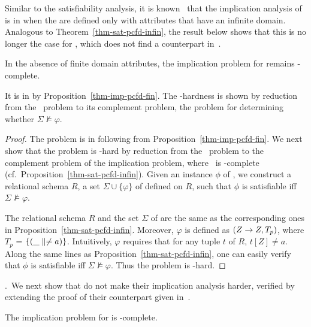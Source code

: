 Similar to the satisfiability analysis,
it is known~\cite{CFDs} that the implication analysis of
\CFDs is in \PTIME when the \CFDs are defined only with attributes that
have an infinite domain. Analogous to Theorem~\ref{thm-sat-pcfd-infin},
the result below shows that this is no longer the case for \pCFDs,
which does not find a counterpart in~\cite{CFDs}.

\begin{theorem}
\label{thm-imp-pcfd-infin} In the absence of finite domain
attributes, the implication problem for \pCFDs remains
\coNP-complete. 
\end{theorem}


\proofs It is in \coNP by
Proposition~\ref{thm-imp-pcfd-fin}. The \coNP-hardness is shown
by reduction from the \kSAT\ problem to its complement problem, \ie
the problem for determining whether $\Sigma\not\models\varphi$.
\eop

\begin{proof}
The problem is in \coNP following from
Proposition~\ref{thm-imp-pcfd-fin}. We next show that the problem is
\coNP-hard by reduction from the \kSAT\ problem to the complement
problem of the implication problem, where \kSAT\ is \NP-complete
(cf.~Proposition~\ref{thm-sat-pcfd-infin}). Given an instance $\phi$
of \kSAT, we construct a relational schema $R$, a set
$\Sigma\cup\{\varphi\}$ of \pCFDs defined on $R$, such that $\phi$
is satisfiable iff $\Sigma\not\models\varphi$.


The relational schema $R$ and the set $\Sigma$ of \pCFDs are the same
as the corresponding ones in Proposition~\ref{thm-sat-pcfd-infin}.
Moreover, $\varphi$ is defined as $(Z \rightarrow Z, T_p)$, where $T_{p}$ =
$\{(\_ \parallel \ne a)\}$. Intuitively, $\varphi$ requires that for any
tuple $t$ of $R$, $t[Z] \ne a$. Along the same lines as
Proposition~\ref{thm-sat-pcfd-infin}, one can easily verify that
$\phi$ is satisfiable iff $\Sigma\not\models\varphi$. Thus the
problem is \coNP-hard. 
\end{proof}




.~We next show that \pCINDs
do not make their implication analysis harder, verified by extending the proof of
their \CINDs counterpart given in~\cite{CINDs}.

\begin{prop}
\label{thm-imp-pcind-fin}The implication problem for \pCINDs is
\EXPTIME-complete. \eop
\end{prop}
\vspace{-1ex}

